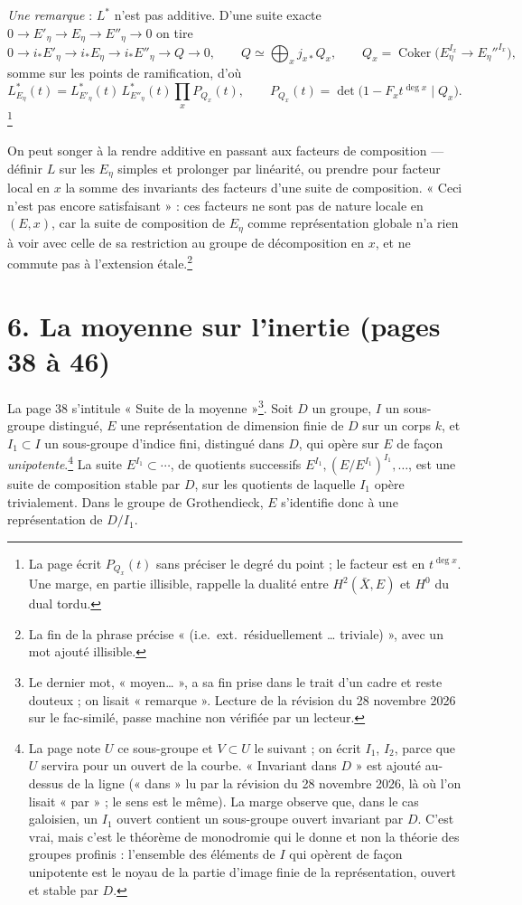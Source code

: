 \documentclass[11pt,a4paper]{article}
\begin{document}
\emph{Une remarque} : $L^{*}$ n'est pas additive. D'une suite exacte
$0 \to E'_\eta \to E_\eta \to E''_\eta \to 0$ on tire
\[
  0 \to i_{*}E'_\eta \to i_{*}E_\eta \to i_{*}E''_\eta \to Q \to 0,
  \qquad Q \simeq \bigoplus_x j_{x*}Q_x, \qquad
  Q_x = \operatorname{Coker}\bigl(E_\eta^{I_x} \to E_\eta''^{I_x}\bigr),
\]
somme sur les points de ramification, d'où
\[
  L^{*}_{E_\eta}(t) = L^{*}_{E'_\eta}(t)\,L^{*}_{E''_\eta}(t)\prod_x P_{Q_x}(t),
  \qquad P_{Q_x}(t) = \det\bigl(1 - F_x t^{\deg x} \mid Q_x\bigr).
\]
\footnote{La page écrit $P_{Q_x}(t)$ sans préciser le degré du point ; le
facteur est en $t^{\deg x}$. Une marge, en partie illisible, rappelle la dualité
entre $H^2(\bar X, E)$ et $H^0$ du dual tordu.}

On peut songer à la rendre additive en passant aux facteurs de composition
--- définir $L$ sur les $E_\eta$ simples et prolonger par linéarité, ou prendre
pour facteur local en $x$ la somme des invariants des facteurs d'une suite de
composition. « Ceci n'est pas encore satisfaisant » : ces facteurs ne sont pas
de nature locale en $(E, x)$, car la suite de composition de $E_\eta$ comme
représentation globale n'a rien à voir avec celle de sa restriction au groupe
de décomposition en $x$, et ne commute pas à l'extension étale.\footnote{La
fin de la phrase précise « (i.e.\ ext.\ résiduellement … triviale) », avec un
mot ajouté illisible.}

\section*{6. La moyenne sur l'inertie (pages 38 à 46)}

La page 38 s'intitule « Suite de la moyenne »\footnote{Le dernier mot,
« moyen… », a sa fin prise dans le trait d'un cadre et reste douteux ; on
lisait « remarque ». Lecture de la révision du 28 novembre 2026 sur le
fac-similé, passe machine non vérifiée par un lecteur.}. Soit $D$ un groupe, $I$ un
sous-groupe distingué, $E$ une représentation de dimension finie de $D$ sur un
corps $k$, et $I_1 \subset I$ un sous-groupe d'indice fini, distingué dans
$D$, qui opère sur $E$ de façon \emph{unipotente}.\footnote{La page note $U$
ce sous-groupe et $V \subset U$ le suivant ; on écrit $I_1$, $I_2$, parce que
$U$ servira pour un ouvert de la courbe. « Invariant dans $D$ » est ajouté
au-dessus de la ligne (« dans » lu par la révision du 28 novembre 2026, là où
l'on lisait « par » ; le sens est le même). La marge observe que, dans le cas galoisien, un $I_1$
ouvert contient un sous-groupe ouvert invariant par $D$. C'est vrai, mais
c'est le théorème de monodromie qui le donne et non la théorie des groupes
profinis : l'ensemble des éléments de $I$ qui opèrent de façon unipotente est
le noyau de la partie d'image finie de la représentation, ouvert et stable par
$D$.} La suite $E^{I_1} \subset \cdots$, de quotients successifs
$E^{I_1}, (E/E^{I_1})^{I_1}, \dots$, est une suite de composition stable par
$D$, sur les quotients de laquelle $I_1$ opère trivialement. Dans le groupe de
Grothendieck, $E$ s'identifie donc à une représentation de $D/I_1$.
\end{document}
